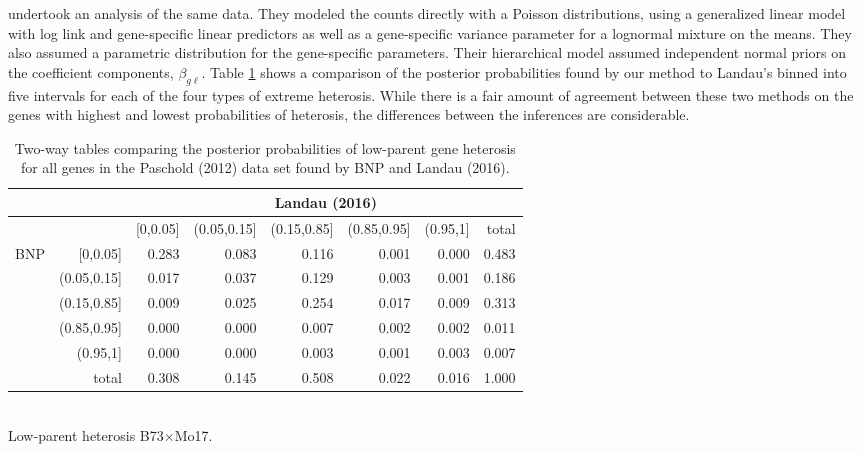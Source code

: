 {\citet{landau2016high} undertook an analysis of the same data. They modeled the counts directly with a Poisson distributions, using a generalized linear model with log link and gene-specific linear predictors as well as a gene-specific variance parameter for a lognormal mixture on the means. They also assumed a parametric distribution for the gene-specific parameters. Their hierarchical model assumed independent normal priors on the coefficient components, $\beta_{g\ell}$. Table \ref{bayes-compare1} shows a comparison of the posterior probabilities found by our method to Landau's binned into five intervals for each of the four types of extreme heterosis. While there is a fair amount of agreement between these two methods on the genes with highest and lowest probabilities of heterosis, the differences between the inferences are considerable.

\begin{table}[ht]
\footnotesize
\centering
\caption{Two-way tables comparing the posterior probabilities of low-parent gene heterosis for all genes in the Paschold (2012) data set found by BNP and Landau (2016).}
\label{bayes-compare1}
\begin{tabular}{rrrrrrr|r}
&  &\multicolumn{6}{c}{Landau (2016)}\\
  \toprule
&  & [0,0.05] & (0.05,0.15] & (0.15,0.85] & (0.85,0.95] & (0.95,1] & total \\
  \midrule
\multirow{6}{*}{BNP} & [0,0.05]    & 0.283 & 0.083 & 0.116 & 0.001 & 0.000 & 0.483 \\
                     & (0.05,0.15] & 0.017 & 0.037 & 0.129 & 0.003 & 0.001 & 0.186 \\
                     & (0.15,0.85] & 0.009 & 0.025 & 0.254 & 0.017 & 0.009 & 0.313 \\
                     & (0.85,0.95] & 0.000 & 0.000 & 0.007 & 0.002 & 0.002 & 0.011 \\
                     & (0.95,1]    & 0.000 & 0.000 & 0.003 & 0.001 & 0.003 & 0.007 \\
                     \midrule
                     & total       & 0.308 & 0.145 & 0.508 & 0.022 & 0.016 & 1.000 \\
   \bottomrule
\end{tabular}
\\[.5cm]
Low-parent heterosis B73$\times$Mo17.
\\[.75cm]


\end{table}}

